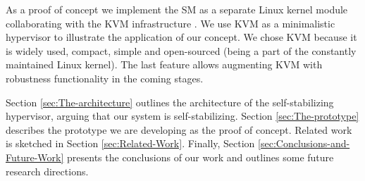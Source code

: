 As a proof of concept we implement the SM as a separate Linux kernel
module collaborating with the KVM infrastructure \cite{kvm-site}.
We use KVM as a minimalistic hypervisor to illustrate the application
of our concept. We chose KVM because it is widely used, compact, simple
and open-sourced (being a part of the constantly maintained Linux
kernel). The last feature allows augmenting KVM with robustness functionality
in the coming stages.

Section \ref{sec:The-architecture} outlines the architecture of the
self-stabilizing hypervisor, arguing that our system is self-stabilizing.
Section \ref{sec:The-prototype} describes the prototype we are developing
as the proof of concept. Related work is sketched in Section \ref{sec:Related-Work}.
Finally, Section \ref{sec:Conclusions-and-Future-Work} presents the
conclusions of our work and outlines some future research directions. 
